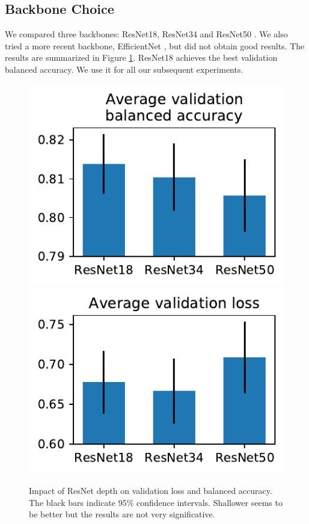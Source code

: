 \documentclass[final]{cvpr}
\begin{document}
\subsection{Backbone Choice}
We compared three backbones: ResNet18, ResNet34 and ResNet50 \cite{resnet}. We also tried a more recent backbone, EfficientNet \cite{efn}, but did not obtain good results.
The results are summarized in Figure \ref{fig:resnet}. ResNet18 achieves the best validation balanced accuracy. We use it for all our subsequent experiments.

\begin{figure}[t]
	\begin{center}
		\includegraphics[width=0.47\linewidth]{resnets_bal_acc.pdf}
		\includegraphics[width=0.47\linewidth]{resnets_val_loss.pdf}
	\end{center}
	\caption{Impact of ResNet depth on validation loss and balanced accuracy. The black bars indicate 95\% confidence intervals. Shallower seems to be better but the results are not very significative.}
	\label{fig:resnet}
\end{figure}
\end{document}
